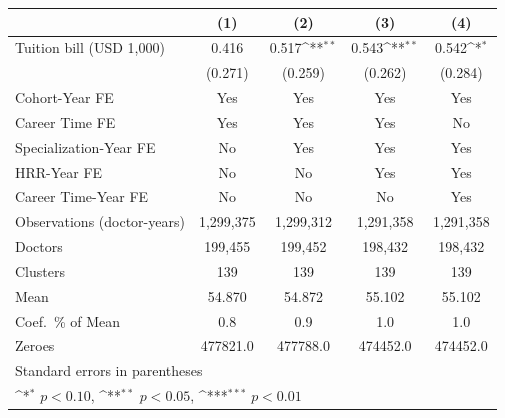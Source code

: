 {
\def\sym#1{\ifmmode^{#1}\else\(^{#1}\)\fi}
\begin{tabular}{l*{4}{c}}
\hline\hline
                    &\multicolumn{1}{c}{(1)}         &\multicolumn{1}{c}{(2)}         &\multicolumn{1}{c}{(3)}         &\multicolumn{1}{c}{(4)}         \\
\hline
Tuition bill (USD 1,000)&       0.416         &       0.517\sym{**} &       0.543\sym{**} &       0.542\sym{*}  \\
                    &     (0.271)         &     (0.259)         &     (0.262)         &     (0.284)         \\
[1em]
Cohort-Year FE      &         Yes         &         Yes         &         Yes         &         Yes         \\
[1em]
Career Time FE      &         Yes         &         Yes         &         Yes         &          No         \\
[1em]
Specialization-Year FE&          No         &         Yes         &         Yes         &         Yes         \\
[1em]
HRR-Year FE         &          No         &          No         &         Yes         &         Yes         \\
[1em]
Career Time-Year FE &          No         &          No         &          No         &         Yes         \\
\hline
Observations (doctor-years)&   1,299,375         &   1,299,312         &   1,291,358         &   1,291,358         \\
Doctors             &     199,455         &     199,452         &     198,432         &     198,432         \\
Clusters            &         139         &         139         &         139         &         139         \\
Mean                &      54.870         &      54.872         &      55.102         &      55.102         \\
Coef.\ \% of Mean   &         0.8         &         0.9         &         1.0         &         1.0         \\
Zeroes              &    477821.0         &    477788.0         &    474452.0         &    474452.0         \\
\hline\hline
\multicolumn{5}{l}{\footnotesize Standard errors in parentheses}\\
\multicolumn{5}{l}{\footnotesize \sym{*} \(p<0.10\), \sym{**} \(p<0.05\), \sym{***} \(p<0.01\)}\\
\end{tabular}
}
